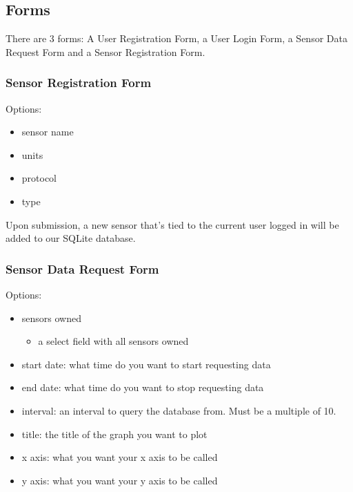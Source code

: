 \subsection{Forms}\label{forms}

There are 3 forms: A User Registration Form, a User Login Form, a Sensor
Data Request Form and a Sensor Registration Form.

\subsubsection{Sensor Registration Form}\label{sensor-registration-form}

Options:

\begin{itemize}
\itemsep1pt\parskip0pt
\item
  sensor name
\item
  units
\item
  protocol
\item
  type
\end{itemize}

Upon submission, a new sensor that's tied to the current user logged in
will be added to our SQLite database.

\subsubsection{Sensor Data Request Form}\label{sensor-data-request-form}

Options:

\begin{itemize}
\itemsep1pt\parskip0pt
\item
  sensors owned

  \begin{itemize}
  \itemsep1pt\parskip0pt
  \item
    a select field with all sensors owned
  \end{itemize}
\item
  start date: what time do you want to start requesting data
\item
  end date: what time do you want to stop requesting data
\item
  interval: an interval to query the database from. Must be a multiple
  of 10.
\item
  title: the title of the graph you want to plot
\item
  x axis: what you want your x axis to be called
\item
  y axis: what you want your y axis to be called
\end{itemize}

